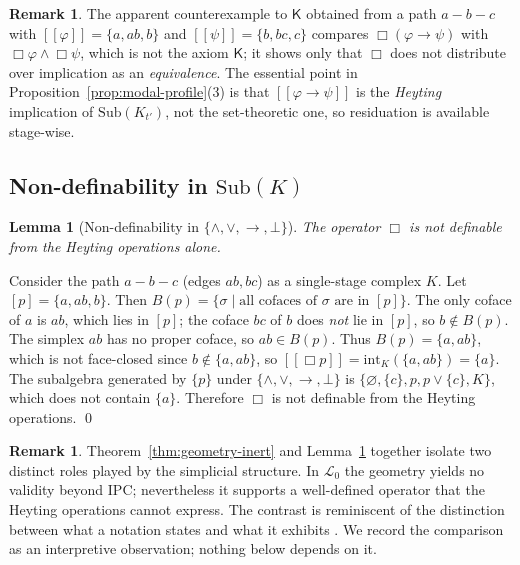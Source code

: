 \documentclass[final,12pt]{elsarticle}
\newcommand{\llbracket}{[\![}
\newcommand{\rrbracket}{]\!]}
\theoremstyle{plain}
\newtheorem{lem}[thm]{Lemma}
\theoremstyle{definition}
\newtheorem{rem}[thm]{Remark}
\begin{document}
\begin{rem}
The apparent counterexample to \(\mathsf{K}\) obtained from a path
\(a\!-\!b\!-\!c\) with \(\llbracket\varphi\rrbracket=\{a,ab,b\}\) and
\(\llbracket\psi\rrbracket=\{b,bc,c\}\) compares
\(\Box(\varphi\to\psi)\) with \(\Box\varphi\wedge\Box\psi\), which is not the
axiom \(\mathsf{K}\); it shows only that \(\Box\) does not distribute over
implication as an \emph{equivalence}.  The essential point in
Proposition~\ref{prop:modal-profile}(3) is that
\(\llbracket\varphi\to\psi\rrbracket\) is the \emph{Heyting} implication of
\(\mathrm{Sub}(K_{t'})\), not the set-theoretic one, so residuation is
available stage-wise.
\end{rem}

\subsection{Non-definability in \(\mathrm{Sub}(K)\)}

\begin{lem}[Non-definability in \(\{ \wedge, \vee, \to, \bot \}\)]
\label{lem:box-non-definable}
The operator \(\Box\) is not definable from the Heyting operations alone.
\end{lem}

\proof
Consider the path \(a \!-\! b \!-\! c\) (edges \(ab, bc\)) as a single-stage
complex \(K\).  Let \([p] = \{a, ab, b\}\).  Then
\(B(p) = \{\sigma \mid \text{all cofaces of }\sigma\text{ are in }[p]\}\).
The only coface of \(a\) is \(ab\), which lies in \([p]\); the coface \(bc\) of
\(b\) does \emph{not} lie in \([p]\), so \(b \notin B(p)\).  The simplex \(ab\)
has no proper coface, so \(ab \in B(p)\).
Thus \(B(p) = \{a, ab\}\), which is not face-closed since \(b \notin \{a,ab\}\),
so \(\llbracket\Box p\rrbracket = \mathrm{int}_K(\{a, ab\}) = \{a\}\).
The subalgebra generated by \(\{p\}\) under \(\{\wedge,\vee,\to,\bot\}\) is
\(\{\varnothing, \{c\}, p, p \vee \{c\}, K\}\), which does not contain
\(\{a\}\).  Therefore \(\Box\) is not definable from the Heyting operations.
\qed

\begin{rem}
Theorem~\ref{thm:geometry-inert} and Lemma~\ref{lem:box-non-definable}
together isolate two distinct roles played by the simplicial structure. In
\(\mathcal L_0\) the geometry yields no validity beyond IPC; nevertheless it
supports a well-defined operator that the Heyting operations cannot express.
The contrast is reminiscent of the distinction between what a notation states
and what it exhibits \cite[4.1212]{wittgenstein1922}. We record the comparison
as an interpretive observation; nothing below depends on it.
\end{rem}
\end{document}
